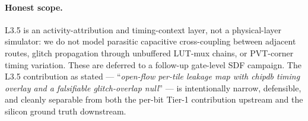 \paragraph{Honest scope.}
L3.5 is an activity-attribution and timing-context layer, not a
physical-layer simulator: we do not model parasitic capacitive cross-coupling
between adjacent routes, glitch propagation through unbuffered LUT-mux
chains, or PVT-corner timing variation.  These are deferred to a follow-up
gate-level SDF campaign.  The L3.5 contribution as stated --- ``\emph{open-flow
per-tile leakage map with chipdb timing overlay and a falsifiable
glitch-overlap null}'' --- is intentionally narrow, defensible, and cleanly
separable from both the per-bit Tier-1 contribution upstream and the silicon
ground truth downstream.

